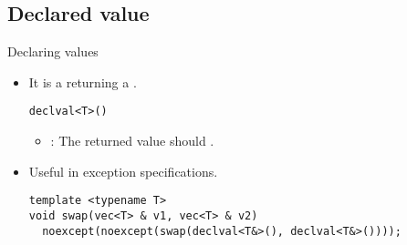 \subsection{Declared value}

\begin{frame}[t,fragile]{Declaring values}
  \begin{itemize}
    \item It is a  returning a .
\begin{lstlisting}
declval<T>()
\end{lstlisting}
      \begin{itemize}
        \pause
        \item {}: The returned value should .
      \end{itemize}
    \pause
    \item Useful in exception specifications.
\begin{lstlisting}
template <typename T>
void swap(vec<T> & v1, vec<T> & v2) 
  noexcept(noexcept(swap(declval<T&>(), declval<T&>())));
\end{lstlisting}
  \end{itemize}
\end{frame}

